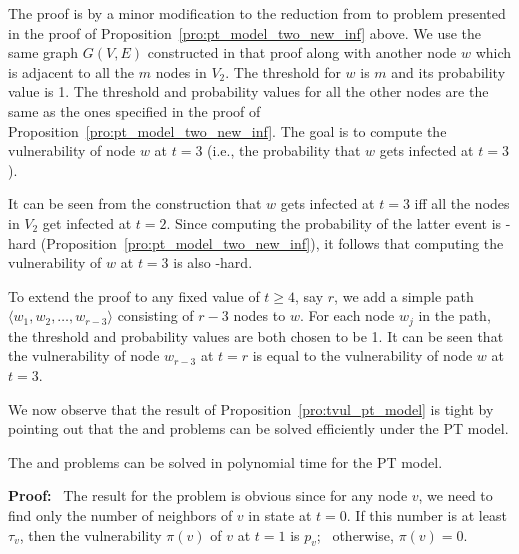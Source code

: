 The proof is by a minor modification 
to the reduction from \mtsat{} to \tNewInfs{} problem presented
in the proof of Proposition~\ref{pro:pt_model_two_new_inf} above.
We use the same graph $G(V,E)$ constructed in that proof 
along with another node $w$ which is adjacent to all the $m$ nodes in $V_2$.
The threshold for $w$ is $m$ and its probability value is 1.
The threshold and probability values for all the other nodes are the same as the
ones specified in the proof of Proposition~\ref{pro:pt_model_two_new_inf}.
The goal is to compute the vulnerability of node $w$ at $t = 3$
(i.e., the probability that $w$ gets infected at $t = 3$).

It can be seen from the construction that $w$ gets infected at $t = 3$
iff all the nodes in $V_2$ get infected at $t = 2$.
Since computing the probability of the latter event is \cnump-hard
(Proposition~\ref{pro:pt_model_two_new_inf}), it follows
that computing the vulnerability of $w$ at $t = 3$ is also
\cnump-hard.

To extend the proof to any fixed value of $t \geq 4$, say $r$, 
we add a simple path $\langle w_1, w_2, \ldots, w_{r-3}\rangle$
consisting of $r-3$ nodes to $w$.
For each node $w_j$ in the path, the threshold and probability values
are both chosen to be 1.
It can be seen that the vulnerability of node $w_{r-3}$ at $t = r$ is
equal to the vulnerability of node $w$ at $t = 3$.
\QED

We now observe that the result of Proposition~\ref{pro:tvul_pt_model}
is tight by pointing out that the \OneVuls{} and \TwoVuls{} problems
can be solved efficiently under the PT model.

\begin{proposition}\label{pro:pt_one_two_vul_poly}
The \OneVuls{} and \TwoVuls{} problems can be solved in polynomial
time for the PT model.
\end{proposition}

\noindent
\textbf{Proof:}~ The result for the \OneVuls{} problem is obvious 
since for any node $v$,
we need to find only the number of neighbors of $v$ 
in state \istate{} at $t = 0$.
If this number is at least $\tau_v$, then the vulnerability $\pi(v)$ of $v$
at $t = 1$ is $p_v$;~ otherwise, $\pi(v) = 0$. 

